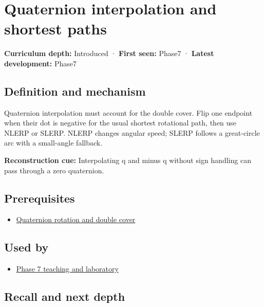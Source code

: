 \hypertarget{appendix-9b4b8254f26b}{}\label{referencestart:appendix-9b4b8254f26b}
\section{Quaternion interpolation and shortest paths}\label{appendix-9b4b8254f26b-quaternion-interpolation-and-shortest-paths}

\textbf{Curriculum depth:} Introduced · \textbf{First seen:} Phase7 · \textbf{Latest development:} Phase7

\subsection{Definition and mechanism}\label{appendix-9b4b8254f26b-definition-and-mechanism}

Quaternion interpolation must account for the double cover. Flip one endpoint when their dot is negative for the usual shortest rotational path, then use NLERP or SLERP. NLERP changes angular speed; SLERP follows a great-circle arc with a small-angle fallback.

\textbf{Reconstruction cue:} Interpolating q and minus q without sign handling can pass through a zero quaternion.

\subsection{Prerequisites}\label{appendix-9b4b8254f26b-prerequisites}

\begin{itemize}
\tightlist
\item
  \hyperref[appendix-8e61ab68f6b2]{Quaternion rotation and double cover}
\end{itemize}

\subsection{Used by}\label{appendix-9b4b8254f26b-used-by}

\begin{itemize}
\tightlist
\item
  \hyperref[01-foundations-i-ch018-keep-the-promises-visible-while-moving-between-representations]{Phase 7 teaching and laboratory}
\end{itemize}

\subsection{Recall and next depth}\label{appendix-9b4b8254f26b-recall-and-next-depth}

